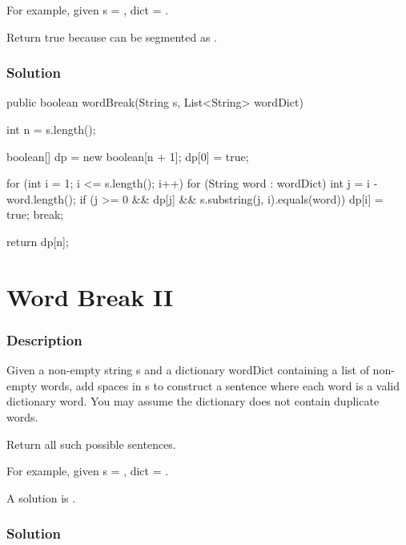 For example, given
s = ,
dict = .

Return true because  can be segmented as .

\subsubsection{Solution}

\begin{Code}
public boolean wordBreak(String s, List<String> wordDict) {
    int n = s.length();

    boolean[] dp = new boolean[n + 1];
    dp[0] = true;

    for (int i = 1; i <= s.length(); i++) {
        for (String word : wordDict) {
            int j = i - word.length();
            if (j >= 0 && dp[j] && s.substring(j, i).equals(word)) {
                dp[i] = true;
                break;
            }
        }
    }

    return dp[n];
}
\end{Code}

\newpage

\section{Word Break II} %

\subsubsection{Description}
Given a non-empty string s and a dictionary wordDict containing a list of non-empty words, add spaces in s to construct a sentence where each word is a valid dictionary word. You may assume the dictionary does not contain duplicate words.

Return all such possible sentences.

For example, given
s = ,
dict = .

A solution is .

\subsubsection{Solution}

